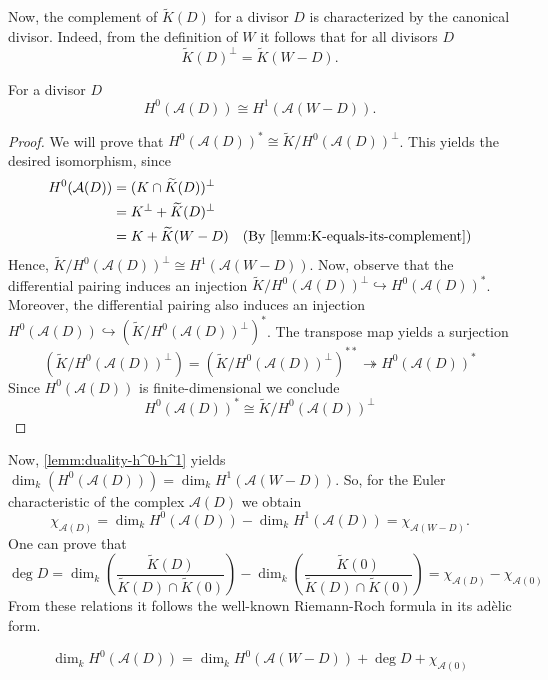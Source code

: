 Now, the complement of $\widetilde{K}(D)$ for a divisor $D$ is characterized by the canonical divisor. Indeed, from the definition of $W$ it follows that for all divisors $D$
\[
	\widetilde{K}(D)^{\perp} = \widetilde{K}(W - D).
\]
\begin{lemma}\label{lemm:duality-h^0-h^1}
	For a divisor $D$
	\[
		H^{0}(\mathcal{A}(D)) \cong H^{1}(\mathcal{A}(W - D)).
	\]
\end{lemma}
\begin{proof}
	We will prove that $H^{0}(\mathcal{A}(D))^{*}\cong \widetilde{K}/H^{0}(\mathcal{A}(D))^{\perp}$. This yields the desired isomorphism, since
	\begin{align*}
		H^{0}(\mathcal{A}(D)) &= (K\cap \widetilde{K}(D))^{\perp}\\
		&= K^{\perp} + \widetilde{K}(D)^{\perp} \\
		&= K + \widetilde{K}(W - D) \quad (\text{By }\cref{lemm:K-equals-its-complement})
	\end{align*}
	Hence, $\widetilde{K}/H^{0}(\mathcal{A}(D))^{\perp} \cong H^{1}(\mathcal{A}(W - D))$. Now, observe that the differential pairing induces an injection $\widetilde{K}/H^{0}(\mathcal{A}(D))^{\perp} \hookrightarrow H^{0}(\mathcal{A}(D))^{*}$. Moreover, the differential pairing also induces an injection $H^{0}(\mathcal{A}(D)) \hookrightarrow (\widetilde{K}/H^{0}(\mathcal{A}(D))^{\perp})^{*}$. The transpose map yields a surjection
	\[
		(\widetilde{K}/H^{0}(\mathcal{A}(D))^{\perp}) = (\widetilde{K}/H^{0}(\mathcal{A}(D))^{\perp})^{**} \twoheadrightarrow H^{0}(\mathcal{A}(D))^{*}
	\]
	Since $H^{0}(\mathcal{A}(D))$ is finite-dimensional we conclude 
	\[
		H^{0}(\mathcal{A}(D))^{*}\cong \widetilde{K}/H^{0}(\mathcal{A}(D))^{\perp}
	\]	
\end{proof}
Now, \cref{lemm:duality-h^0-h^1} yields $\dim_{k}(H^{0}(\mathcal{A}(D))) = \dim_{k}H^{1}(\mathcal{A}(W - D))$. So, for the Euler characteristic of the complex $\mathcal{A}(D)$ we obtain
\[
	\chi_{\mathcal{A}(D)} = \dim_{k}H^{0}(\mathcal{A}(D)) - \dim_{k}H^{1}(\mathcal{A}(D)) = \chi_{\mathcal{A}(W - D)}.
\]
One can prove that
\[
	\deg D = \dim_{k}\left(\frac{\widetilde{K}(D)}{\widetilde{K}(D)\cap\widetilde{K}(0)}\right) - \dim_{k}\left(\frac{\widetilde{K}(0)}{\widetilde{K}(D)\cap\widetilde{K}(0)}\right) = \chi_{\mathcal{A}(D)} - \chi_{\mathcal{A}(0)}
\]
From these relations it follows the well-known Riemann-Roch formula in its adèlic form.
\begin{theorem}\label{thm:riemann-roch-adèle}
	\[
		\dim_{k} H^{0}(\mathcal{A}(D)) = \dim_{k}H^{0}(\mathcal{A}(W - D)) + \deg D + \chi_{\mathcal{A}(0)}
	\]
\end{theorem}

